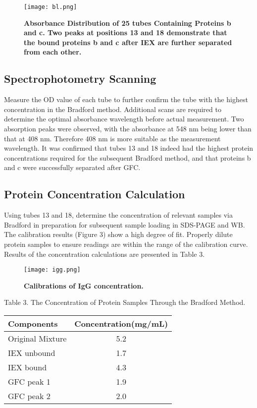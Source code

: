 \documentclass[a4paper,10pt]{article}
\begin{document}
\begin{multicols}{2}
\begin{figure}[H]
\centering
\texttt{[image: bl.png]}
\caption{\scriptsize \textbf{Absorbance Distribution of 25 tubes Containing Proteins b and c. Two peaks at positions 13 and 18 demonstrate that the bound proteins b and c after IEX are further separated from each other.}}
\label{fig3}
\end{figure}


\subsection{Spectrophotometry Scanning}
Measure the OD value of each tube to further confirm the tube with the highest concentration in the Bradford method. Additional scans are required to determine the optimal absorbance wavelength before actual measurement. Two absorption peaks were observed, with the absorbance at 548 nm being lower than that at 408 nm. Therefore 408 nm is more suitable as the measurement wavelength. It was confirmed that tubes 13 and 18 indeed had the highest protein concentrations required for the subsequent Bradford method, and that proteins b and c were successfully separated after GFC.


\subsection{Protein Concentration Calculation}
Using tubes 13 and 18, determine the concentration of relevant samples via Bradford in preparation for subsequent sample loading in SDS-PAGE and WB. The calibration results (Figure 3) show a high degree of fit. Properly dilute protein samples to ensure readings are within the range of the calibration curve. Results of the concentration calculations are presented in Table 3.


\begin{figure}[H]
\centering
\texttt{[image: igg.png]}
\caption{\scriptsize \textbf{Calibrations of IgG concentration.}}
\label{fig4}
\end{figure}


\begin{center}
{Table 3. The Concentration of Protein Samples Through the Bradford Method.}
\vspace{0pt}
\begin{table}[H]
\setlength{\tabcolsep}{5pt}
\begin{tabular}{lc}
\toprule [1pt]
Components&Concentration(mg/mL)\\
\hline
Original Mixture & 5.2\\
IEX unbound & 1.7 \\
IEX bound & 4.3 \\
GFC peak 1 & 1.9 \\
GFC peak 2 & 2.0\\
\bottomrule [1pt]
\end{tabular}
\end{table}
\end{center}



\end{multicols}
\end{document}
